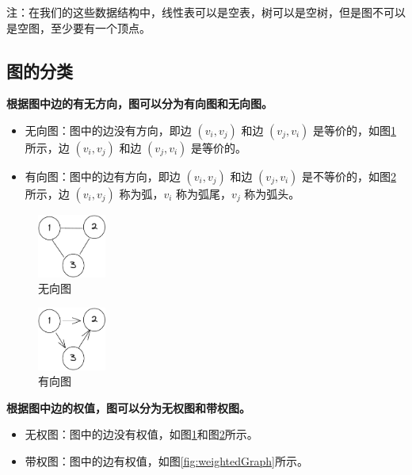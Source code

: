 \documentclass[lang=cn,newtx,10pt,scheme=chinese]{../elegantbook}
\begin{document}
注：在我们的这些数据结构中，线性表可以是空表，树可以是空树，但是图不可以是空图，至少要有一个顶点。

\subsection{图的分类}

\textbf{根据图中边的有无方向，图可以分为有向图和无向图。}

\begin{itemize}
  \item 无向图：图中的边没有方向，即边 $(v_i, v_j)$ 和边 $(v_j, v_i)$ 是等价的，如图\ref{fig:undirectedGraph}所示，边 $(v_i, v_j)$ 和边 $(v_j, v_i)$ 是等价的。
  \item 有向图：图中的边有方向，即边 $(v_i, v_j)$ 和边 $(v_j, v_i)$ 是不等价的，如图\ref{fig:directedGraph}所示，边 $(v_i, v_j)$ 称为弧，$v_i$ 称为弧尾，$v_j$ 称为弧头。
  \end{itemize}

  \begin{figure}[!htbp]
    \centering
    \includegraphics[width=0.2\textwidth]{./figure/pdf/cropped/undirection.pdf}
    \caption{无向图}
    \label{fig:undirectedGraph}
  \end{figure}

  \begin{figure}[!htbp]
    \centering
    \includegraphics[width=0.2\textwidth]{./figure/pdf/cropped/direction.pdf}
    \caption{有向图}
    \label{fig:directedGraph}

  \end{figure}

  \textbf{根据图中边的权值，图可以分为无权图和带权图。}

  \begin{itemize}
    \item 无权图：图中的边没有权值，如图\ref{fig:undirectedGraph}和图\ref{fig:directedGraph}所示。
    \item 带权图：图中的边有权值，如图\ref{fig:weightedGraph}所示。
    \end{itemize}
\end{document}
